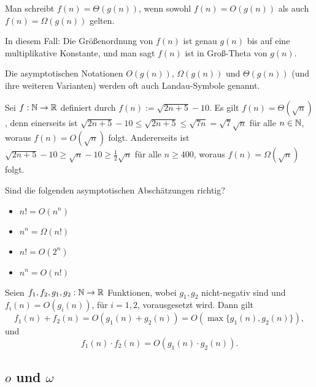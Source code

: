 \begin{defn} 
Man schreibt $f(n) = \Theta(g(n))$, wenn sowohl $f(n) = O(g(n))$ als auch$f(n) = \Omega(g(n))$ gelten.
\end{defn} 

\begin{bem}
In diesem Fall: Die Größenordnung von $f(n)$ ist genau $g(n)$ bis auf eine multiplikative Konstante, und man sagt \glqq$f(n)$ ist in Groß-Theta von $g(n)$\grqq.
\end{bem} 

\begin{bem}
Die asymptotischen Notationen $O(g(n))$, $\Omega(g(n))$ und $\Theta(g(n))$ (und ihre weiteren Varianten) werden oft auch Landau-Symbole genannt.
\end{bem} 

\begin{bsp}
	Sei $f : \mathbb{N} \to \mathbb{R}$ definiert durch $f(n):=\sqrt{2 n + 5 } - 10$. Es gilt $f(n) = \Theta(\sqrt{n})$, denn einerseits ist $\sqrt{2n + 5} - 10 \le \sqrt{2n + 5} \le \sqrt{ 7n} = \sqrt{7} \sqrt{n}$ für alle $n \in \mathbb{N}$, woraus $f(n) = O(\sqrt{n})$ folgt. Andererseits ist $\sqrt{2n + 5} - 10 \ge \sqrt{n} - 10 \ge \frac{1}{2} \sqrt{n}$ für alle $n \ge 400$, woraus $f(n) = \Omega(\sqrt{n})$ folgt.  
\end{bsp}

\begin{aufg}
	Sind die folgenden asymptotischen Abschätzungen richtig?
	\begin{itemize}
		\item $n! = O(n^n)$
		\item $n^n = \Omega(n!)$
		\item $n! = O(2^n)$
		\item $n^n = O(n!)$
	\end{itemize}
\end{aufg}


\begin{bem}
	Seien $f_1,f_2,g_1,g_2 : \mathbb{N} \to \mathbb{R}$ Funktionen, wobei $g_1,g_2$ nicht-negativ sind und $f_i(n) = O(g_i(n))$, für $i=1,2$, vorausgesetzt wird. Dann gilt
	\[
	f_1(n) + f_2(n) = O(g_1(n)+g_2(n)) = O(\max\{g_1(n),g_2(n)\}),
	\]
	und
	\[
	f_1(n) \cdot f_2(n) = O(g_1(n)\cdot g_2(n)).
	\]
\end{bem}

\subsection{$o$ und $\omega$}

